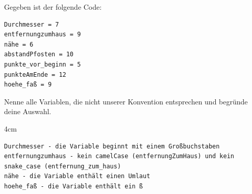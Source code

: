 \question[3]
Gegeben ist der folgende Code:
\begin{lstlisting}
Durchmesser = 7
entfernungzumhaus = 9
nähe = 6
abstandPfosten = 10
punkte_vor_beginn = 5
punkteAmEnde = 12
hoehe_faß = 9
\end{lstlisting}
Nenne alle Variablen, die nicht unserer Konvention entsprechen und begründe deine Auswahl. 
\begin{solutionbox}{4cm}
\begin{lstlisting}
Durchmesser - die Variable beginnt mit einem Großbuchstaben
entfernungzumhaus - kein camelCase (entfernungZumHaus) und kein snake_case (entfernung_zum_haus)
nähe - die Variable enthält einen Umlaut  
hoehe_faß - die Variable enthält ein ß  
\end{lstlisting}
\end{solutionbox}